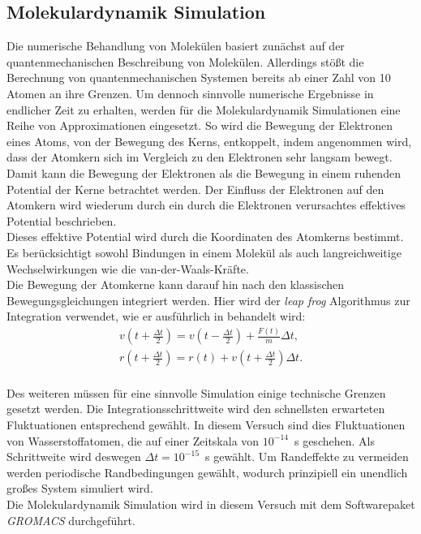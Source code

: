 \subsection{Molekulardynamik Simulation}
Die numerische Behandlung von Molekülen basiert zunächst auf der quantenmechanischen Beschreibung von Molekülen.
Allerdings stößt die Berechnung von quantenmechanischen Systemen bereits ab einer Zahl von 10 Atomen an ihre Grenzen.
Um dennoch sinnvolle numerische Ergebnisse in endlicher Zeit zu erhalten, werden für die Molekulardynamik Simulationen eine Reihe von Approximationen eingesetzt.
So wird die Bewegung der Elektronen eines Atoms, von der Bewegung des Kerns, entkoppelt, indem angenommen wird, dass der Atomkern sich im Vergleich zu den Elektronen sehr langsam bewegt.
Damit kann die Bewegung der Elektronen als die Bewegung in einem ruhenden Potential der Kerne betrachtet werden.
Der Einfluss der Elektronen auf den Atomkern wird wiederum durch ein durch die Elektronen verursachtes effektives Potential beschrieben.
\\ \noindent
Dieses effektive Potential wird durch die Koordinaten des Atomkerns bestimmt. Es berücksichtigt sowohl Bindungen in einem Molekül als auch langreichweitige Wechselwirkungen wie die van-der-Waals-Kräfte.
\\ \noindent
Die Bewegung der Atomkerne kann darauf hin nach den klassischen Bewegungsgleichungen integriert werden.
Hier wird der \emph{leap frog} Algorithmus zur Integration verwendet, wie er ausführlich in \cite{bishop2006pattern} behandelt wird:
\begin{align}
v\left(t+\frac{\Delta t}{2}\right) = v\left(t-\frac{\Delta t}{2}\right) + \frac{F(t)}{m}\Delta t, \\
r\left(t+\frac{\Delta t}{2}\right) = r(t) + v\left(t+\frac{\Delta t}{2}\right)\Delta t.
\end{align}
\\ \noindent
Des weiteren müssen für eine sinnvolle Simulation einige technische Grenzen gesetzt werden.
Die Integrationsschrittweite wird den schnellsten erwarteten Fluktuationen entsprechend gewählt. In diesem Versuch sind dies Fluktuationen von Wasserstoffatomen, die auf einer Zeitskala von $10^{-14}$~s geschehen. Als Schrittweite wird deswegen $\Delta t = 10^{-15}$~s gewählt.
Um Randeffekte zu vermeiden werden periodische Randbedingungen gewählt, wodurch prinzipiell ein unendlich großes System simuliert wird.
\\ \noindent
Die Molekulardynamik Simulation wird in diesem Versuch mit dem Softwarepaket \emph{GROMACS} \cite{gromacs} durchgeführt.

